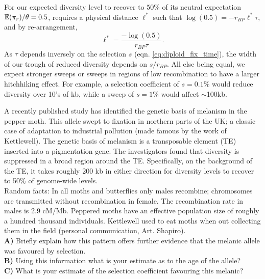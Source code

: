 For our expected diversity level to recover to $50\%$ of
its neutral expectation $\mathbb{E}(\pi_r)/\theta=0.5$, requires a physical
distance $\ell^{*}$ such that $\log(0.5) = -r_{BP} \ell ^*\tau$, and by re-arrangement,
\begin{equation}
\ell^* = \frac{-\log(0.5)}{r_{BP} \tau }.
\end{equation}
As
$\tau$ depends inversely on the selection $s$ (eqn. \eqref{eq:diploid_fix_time}), the width of our trough of reduced diversity depends on $s/r_{BP}$.
All else being equal, we expect stronger sweeps or sweeps in regions of low
recombination to have a larger hitchhiking effect. For example, a selection coefficient of $s=0.1\%$ would reduce
diversity over 10's of kb, while a sweep of $s=1\%$ would affect
$\sim$100kb.   \\


\begin{question}
A recently published study has identified the genetic basis of
melanism in the pepper moth. This allele swept to fixation in northern
parts of the UK; a classic case of adaptation to industrial pollution
(made famous by the work of Kettlewell). The genetic basis of melanism
is a transposable element (TE) inserted into a pigmentation gene. The
investigators found that diversity is suppressed in a broad region
around the TE. Specifically, on the background of the TE, it takes
roughly 200 kb in either direction for diversity levels to recover to
50\% of genome-wide levels. \\

Random facts: In all moths and butterflies only males recombine;
chromosomes are transmitted without recombination in female. The
recombination rate in males is 2.9 cM/Mb.  Peppered moths have an
effective population size of roughly a hundred thousand
individuals. Kettlewell used to eat moths when out collecting them in
the field (personal communication, Art. Shapiro). \\
{\bf A)} Briefly explain how this pattern offers further evidence that the melanic allele was favoured by selection.\\
{\bf B)} Using this information what is your estimate as to the age of the allele?\\
{\bf C)} What is your estimate of the selection coefficient favouring this melanic?
\end{question}


